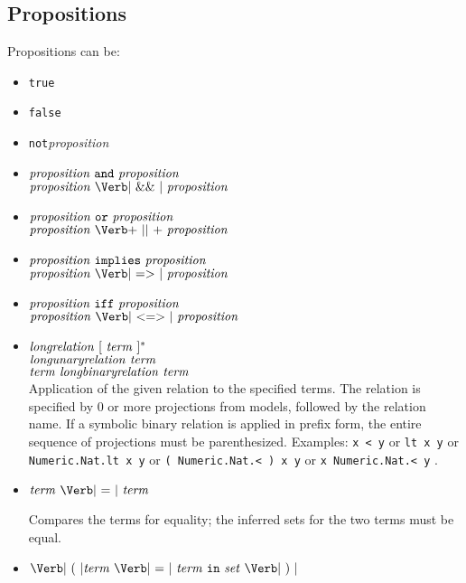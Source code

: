 \documentclass[12pt]{article}
\newcommand{\keywd}[1]{\mbox{\texttt{#1}}\xspace}
\newcommand{\AND}{\keywd{and}}
\newcommand{\FALSE}{\keywd{false}}
\newcommand{\IFF}{\keywd{iff}}
\newcommand{\IMPLY}{\keywd{implies}}
\newcommand{\IN}{\keywd{in}}
\newcommand{\NOT}{\keywd{not}}
\newcommand{\OR}{\keywd{or}}
\newcommand{\TRUE}{\keywd{true}}
\newcommand{\metav}[1]{\mbox{\textit{#1}}\xspace}
\newcommand{\Setexp}{\metav{set}}
\newcommand{\Proposition}{\metav{proposition}}
\newcommand{\Term}{\metav{term}}
\newcommand{\AAND}{\mbox{\Verb| \&\& |}}
\newcommand{\EQUALS}{\mbox{\Verb| = |}}
\newcommand{\IIFF}{\mbox{\Verb| <=> |}}
\newcommand{\IIMPLY}{\mbox{\Verb| => |}}
\newcommand{\LPAREN}{\mbox{\Verb| ( |}}
\newcommand{\OOR}{\mbox{\Verb+ || +}}
\newcommand{\RPAREN}{\mbox{\Verb| ) |}}
\begin{document}
\subsection{Propositions}

Propositions can be:

\begin{itemize}
\item \TRUE

\item \FALSE

\item \NOT \Proposition

\item $\Proposition\ \AND\ \Proposition$\\
      $\Proposition\ \AAND\ \Proposition$

\item $\Proposition\ \OR\ \Proposition$\\
      $\Proposition\ \OOR\ \Proposition$

\item $\Proposition\ \IMPLY\ \Proposition$\\
      $\Proposition\ \IIMPLY\ \Proposition$

\item $\Proposition\ \IFF\ \Proposition$\\
      $\Proposition\ \IIFF\ \Proposition$

\item $\metav{longrelation}\ [\ \Term\ ]^*$\\
      $\metav{longunaryrelation}\ \Term$\\
      $\Term\ \metav{longbinaryrelation}\ \Term$\\
     
      
      Application of the given relation to the specified terms.  The
      relation is specified by 0 or more projections from models,
      followed by the relation name.  If a symbolic binary relation
      is applied in prefix form, the entire sequence of projections
      must be parenthesized. 
      Examples: \Verb|x < y| or \Verb|lt x y| or \Verb|Numeric.Nat.lt x y| or
      \Verb|( Numeric.Nat.< ) x y| or \Verb|x Numeric.Nat.< y| .

\item $\Term\ \EQUALS\ \Term$

   Compares the terms for equality; the inferred sets for the two terms
   must be equal.

\item $\LPAREN \Term\ \EQUALS\ \Term\ \IN\ \Setexp\ \RPAREN$


\end{itemize}
\end{document}
